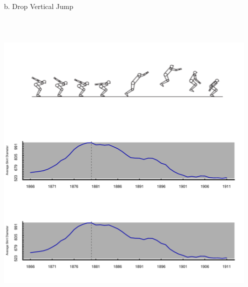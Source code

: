 \documentclass{article}\usepackage[]{graphicx}\usepackage[]{color}
\newenvironment{knitrout}{}{} %
\begin{document}
\newpage


b. Drop Vertical Jump
\begin{knitrout}
\color{fgcolor}

\includegraphics[width=5in,height=6in]{figure/latex-unnamed-chunk-6-1} \hfill{}



\end{knitrout}

\newpage
\end{document}
